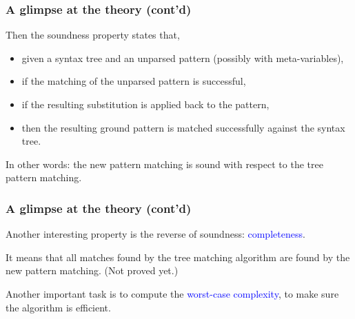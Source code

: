\documentclass[compress,dvips,xcolor={dvipsnames},t]{beamer}
\begin{document}
% 
\begin{frame}
\frametitle{A glimpse at the theory (cont'd)}


Then the soundness property states that, 
\begin{itemize}

  \item given a syntax tree and an unparsed pattern (possibly with
    meta\hyp{}variables),

  \item if the matching of the unparsed pattern is successful,

  \item if the resulting substitution is applied back to the pattern,

  \item then the resulting ground pattern is matched successfully
    against the syntax tree.
\end{itemize}
In other words: the new pattern matching is sound with respect to the
tree pattern matching.

\end{frame}

% 
\begin{frame}
\frametitle{A glimpse at the theory (cont'd)}


Another interesting property is the reverse of soundness:
\textcolor{blue}{completeness}.

It means that all matches found by the tree matching algorithm are
found by the new pattern matching. (Not proved yet.)

Another important task is to compute the \textcolor{blue}{worst\hyp{}case
  complexity}, to make sure the algorithm is efficient.

\end{frame}
\end{document}
